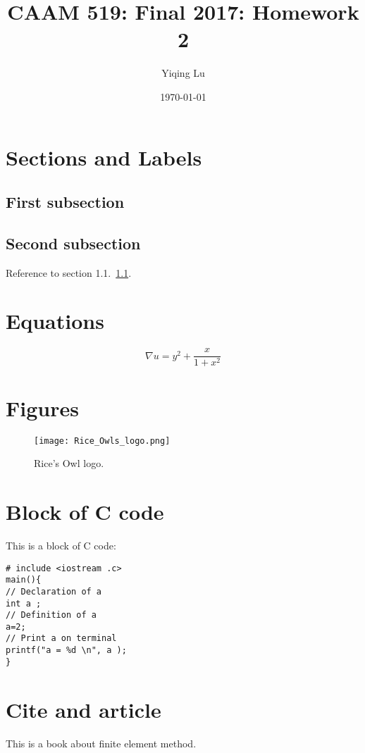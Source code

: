 \documentclass[11pt]{article}
\title{CAAM 519: Final 2017: Homework 2}
\author{Yiqing Lu}
\date{\today}
\begin{document}
\maketitle
\section{Sections and Labels} 
\subsection{First subsection} \label{sec:sec1_sub1}
\subsection{Second subsection} 
Reference to section 1.1.~\ref{sec:sec1_sub1}.

\section{Equations} 
$$\nabla u= y^2 + \dfrac{x}{1+x^2}$$

\section{Figures} 
\begin{figure}[h]
\centering
\texttt{[image: Rice\_Owls\_logo.png]}
\caption{Rice’s Owl logo.}
\label{fig:first_fig}
\end{figure}

\section{Block of C code} 
This is a block of C code:
\begin{lstlisting}[style=CStyle]
# include <iostream .c>
main(){
// Declaration of a
int a ;
// Definition of a
a=2;
// Print a on terminal
printf("a = %d \n", a );
}
\end{lstlisting}

\section{Cite and article} 
This is a book about finite element method\cite{erntheory}.


\end{document}
